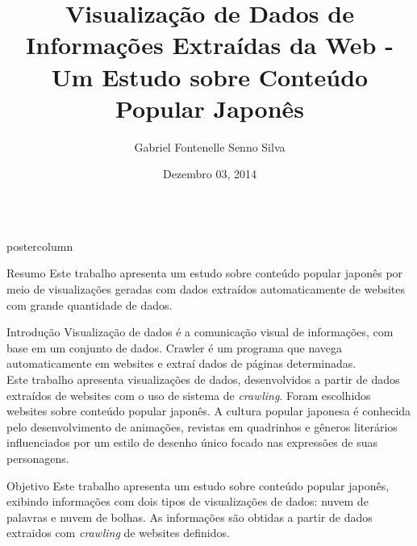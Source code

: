 \documentclass[final,hyperref={pdfpagelabels=false}]{beamer}
\title{\huge Visualização de Dados de Informações Extraídas da Web - Um Estudo sobre Conteúdo Popular Japonês}
\author{Gabriel Fontenelle Senno Silva\inst{1}}
\institute[SENAC]{Centro Universitário Senac - Campus Santo Amaro}
\date[Dezembro 3th, 2014]{Dezembro 03, 2014}
\newlength{\columnheight}
\begin{document}
\begin{frame}
  \begin{columns}%
\begin{column}{.49\textwidth}
      \begin{beamercolorbox}[center,wd=\textwidth]{postercolumn}
        \begin{minipage}[T]{.95\textwidth} %
          \parbox[t][\columnheight]{\textwidth}{ %
            
            \begin{block}{Resumo}
            Este trabalho apresenta um estudo sobre conteúdo popular japonês por meio de visualizações geradas com dados extraídos automaticamente de websites com grande quantidade de dados. 
            \end{block}
            \vfill
            \begin{block}{Introdução}
            Visualização de dados é a comunicação visual de informações, com base em um conjunto de dados. Crawler é um programa que navega automaticamente em websites e extraí dados de páginas determinadas.\\
            Este trabalho apresenta visualizações de dados, desenvolvidos a partir de dados extraídos de websites com o uso de sistema de \emph{crawling}. Foram escolhidos websites sobre conteúdo popular japonês. A cultura popular japonesa é conhecida pelo desenvolvimento de animações, revistas em quadrinhos e gêneros literários influenciados por um estilo de desenho único focado nas expressões de suas personagens. 
            \end{block}
            \vfill
            \begin{block}{Objetivo}
            Este trabalho apresenta um estudo sobre conteúdo popular japonês, exibindo informações com dois tipos de visualizações de dados: nuvem de palavras e nuvem de bolhas. As informações são obtidas a partir de dados extraidos com \emph{crawling} de websites definidos.  
		

\end{block}}
\end{minipage}
\end{beamercolorbox}
\end{column}
\end{columns}
\end{frame}
\end{document}
